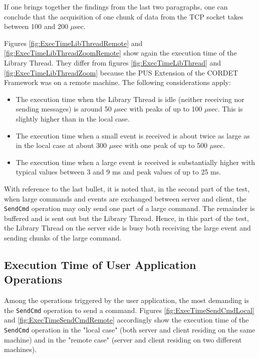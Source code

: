 \documentclass{pnp_article}
\begin{document}
{If one brings together the findings from the last two paragraphs, one can conclude that the acquisition of one chunk of data from the TCP socket takes between 100 and 200 $\mu$sec.

Figures \ref{fig:ExecTimeLibThreadRemote} and \ref{fig:ExecTimeLibThreadZoomRemote} show again the execution time of the Library Thread. They differ from figures \ref{fig:ExecTimeLibThread} and \ref{fig:ExecTimeLibThreadZoom} because the PUS Extension of the CORDET Framework was on a remote machine. The following considerations apply:

\begin{itemize}
\item The execution time when the Library Thread is idle (neither receiving nor sending messages) is around 50 $\mu$sec with peaks of up to 100 $\mu$sec. This is slightly higher than in the local case. 
\item The execution time when a small event is received is about twice as large as in the local case at about 300 $\mu$sec with one peak of up to 500 $\mu$sec.
\item The execution time when a large event is received is substantially higher with typical values between 3 and 9 ms and peak values of up to 25 ms.
\end{itemize}

With reference to the last bullet, it is noted that, in the second part of the test, when large commands and events are exchanged between server and client, the \texttt{SendCmd} operation may only send one part of a large command. The remainder is buffered and is sent out but the Library Thread. Hence, in this part of the test, the Library Thread on the server side is busy both receiving the large event and sending chunks of the large command. 

\subsection{Execution Time of User Application Operations}\label{sec:svrExecTimeUserApp}
Among the operations triggered by the user application, the most demanding is the \texttt{SendCmd} operation to send a command. Figures \ref{fig:ExecTimeSendCmdLocal} and \ref{fig:ExecTimeSendCmdRemote} accordingly show the execution time of the \texttt{SendCmd} operation in the "local case" (both server and client residing on the same machine) and in the "remote case" (server and client residing on two different machines).

}
\end{document}
